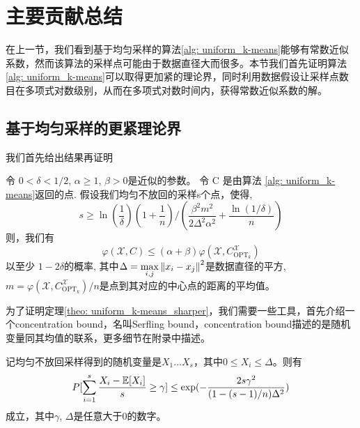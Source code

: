\section{主要贡献总结}

在上一节，我们看到基于均匀采样的算法\ref{alg: uniform_k-means}能够有常数近似系数，然而该算法的采样点可能由于数据直径大而很多。本节我们首先证明算法\ref{alg: uniform_k-means}可以取得更加紧的理论界，同时利用数据假设让采样点数目在多项式对数级别，从而在多项式对数时间内，获得常数近似系数的解。

\subsection{基于均匀采样的更紧理论界}
我们首先给出结果再证明
\begin{theorem}[均匀不放回采样的解的质量2]
    \label{theo: uniform_k-means_sharper}
    令 $0 < \delta <1/2$, $\alpha \geq 1$, $\beta >0$是近似的参数。 令 C 是由算法 \ref{alg: uniform_k-means}返回的点. 假设我们均匀不放回的采样s个点，使得,
    \begin{equation}
    s \geq \ln(\frac{1}{\delta})(1+\frac{1}{n})/(\frac{\beta^2 m^2}{2\Delta^2 \alpha^2}+\frac{\ln(1/\delta)}{n})
    \end{equation}
    则，我们有
    \begin{equation}
    \varphi(\mathcal{X},C) \leq (\alpha + \beta)\varphi(\mathcal{X},C_{\text{OPT}_k}^{\mathcal{X}})
    \end{equation}
    以至少 $1-2\delta$的概率, 其中$\Delta = \max\limits_{i,j}\left\lVert x_i - x_j\right\rVert^2$是数据直径的平方, $m = \varphi(\mathcal{X},C_{\text{OPT}_k}^{\mathcal{X}})/n$是点到其对应的中心点的距离的平均值。
\end{theorem}
为了证明定理\ref{theo: uniform_k-means_sharper}，我们需要一些工具，首先介绍一个concentration bound，名叫Serfling bound，concentration bound描述的是随机变量同其均值的联系，更多细节在附录中描述。
\begin{lemma}
    记均匀不放回采样得到的随机变量是$X_1 \ldots X_s$，其中$0 \leq X_i \leq \Delta$。则有
    \begin{equation}
    P[\sum_{i=1}^s \frac{X_i - \mathbb{E}[X_i]}{s} \geq \gamma] \leq \exp(-\frac{2s\gamma^2}{(1-(s-1)/n)\Delta^2})
    \end{equation}
    成立，其中$\gamma$, $\Delta$是任意大于0的数字。
\end{lemma}
